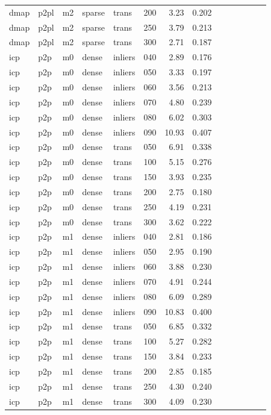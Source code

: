 \begin{table}[htbp]
\begin{tabular}{llllllrrrrrrrr}
  dmap & p2pl & m2 & sparse & trans & 200 & 3.23 & 0.202 \\
  dmap & p2pl & m2 & sparse & trans & 250 & 3.79 & 0.213 \\
  dmap & p2pl & m2 & sparse & trans & 300 & 2.71 & 0.187 \\
  icp & p2p & m0 & dense & inliers & 040 & 2.89 & 0.176 \\
  icp & p2p & m0 & dense & inliers & 050 & 3.33 & 0.197 \\
  icp & p2p & m0 & dense & inliers & 060 & 3.56 & 0.213 \\
  icp & p2p & m0 & dense & inliers & 070 & 4.80 & 0.239 \\
  icp & p2p & m0 & dense & inliers & 080 & 6.02 & 0.303 \\
  icp & p2p & m0 & dense & inliers & 090 & 10.93 & 0.407 \\
  icp & p2p & m0 & dense & trans & 050 & 6.91 & 0.338 \\
  icp & p2p & m0 & dense & trans & 100 & 5.15 & 0.276 \\
  icp & p2p & m0 & dense & trans & 150 & 3.93 & 0.235 \\
  icp & p2p & m0 & dense & trans & 200 & 2.75 & 0.180 \\
  icp & p2p & m0 & dense & trans & 250 & 4.19 & 0.231 \\
  icp & p2p & m0 & dense & trans & 300 & 3.62 & 0.222 \\
  icp & p2p & m1 & dense & inliers & 040 & 2.81 & 0.186 \\
  icp & p2p & m1 & dense & inliers & 050 & 2.95 & 0.190 \\
  icp & p2p & m1 & dense & inliers & 060 & 3.88 & 0.230 \\
  icp & p2p & m1 & dense & inliers & 070 & 4.91 & 0.244 \\
  icp & p2p & m1 & dense & inliers & 080 & 6.09 & 0.289 \\
  icp & p2p & m1 & dense & inliers & 090 & 10.83 & 0.400 \\
  icp & p2p & m1 & dense & trans & 050 & 6.85 & 0.332 \\
  icp & p2p & m1 & dense & trans & 100 & 5.27 & 0.282 \\
  icp & p2p & m1 & dense & trans & 150 & 3.84 & 0.233 \\
  icp & p2p & m1 & dense & trans & 200 & 2.85 & 0.185 \\
  icp & p2p & m1 & dense & trans & 250 & 4.30 & 0.240 \\
  icp & p2p & m1 & dense & trans & 300 & 4.09 & 0.230 \\

\end{tabular}
\end{table}
